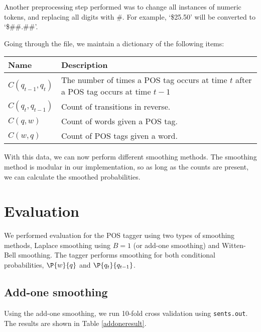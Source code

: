 \documentclass[12pt]{homework}
\begin{document}
Another preprocessing step performed was to change all instances of numeric 
tokens, and replacing all digits with \#. For example, `\$25.50' will be 
converted to `\$\#\#.\#\#'.

Going through the file, we maintain a dictionary of the following items:
\begin{center}
\begin{tabular}{l l}
	\hline
	Name	&	Description\\
	\hline
	$C(q_{t-1},q_t)$	& The number of times a POS tag occurs at time $t$ 
	after a POS tag occurs at time $t-1$ \\
	$C(q_t,q_{t-1})$	& Count of transitions in reverse. \\
	$C(q,w)$	& Count of words given a POS tag. \\
	$C(w,q)$	& Count of POS tags given a word.\\
	\hline
\end{tabular}
\end{center}
With this data, we can now perform different smoothing methods. The smoothing 
method is modular in our implementation, so as long as the counts are present, 
we can calculate the smoothed probabilities.

\section{Evaluation}
We performed evaluation for the POS tagger using two types of smoothing methods, 
Laplace smoothing using $B=1$ (or add-one smoothing) and Witten-Bell smoothing.  
The tagger performs smoothing for both conditional probabilities, $\P{w}{q}$ and 
$\P{q_t}{q_{t-1}}$.
\subsection{Add-one smoothing}
Using the add-one smoothing, we run 10-fold cross validation using
\texttt{sents.out}. The results are shown in Table \ref{addoneresult}.
\end{document}
